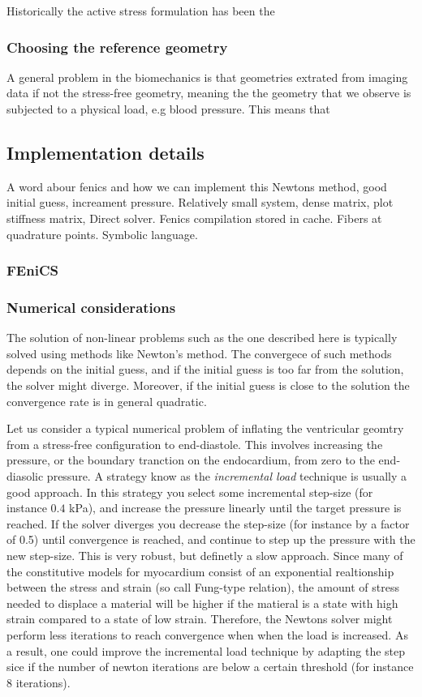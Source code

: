 Historically the active stress formulation has been the


\subsubsection{Choosing the reference geometry}
A general problem in the biomechanics is that geometries extrated from
imaging data if not the stress-free geometry, meaning the the geometry
that we observe is subjected to a physical load, e.g blood pressure.
This means that 


\subsection{Implementation details}
A word abour fenics and how we can implement this
Newtons method, good initial guess, increament pressure.
Relatively small system, dense matrix, plot stiffness matrix, Direct
solver.
Fenics compilation stored in cache.
Fibers at quadrature points. Symbolic language.

\subsubsection{FEniCS}



\subsubsection{Numerical considerations}
The solution of non-linear problems such as the one described here is
typically solved using methods like Newton's method. The convergece of
such methods depends on the initial guess, and if the
initial guess is too far from the solution, the solver might diverge.
Moreover, if the initial guess is close to the solution the
convergence rate is in general quadratic.

Let us consider a
typical numerical problem of inflating the ventricular geomtry from a
stress-free configuration to end-diastole. This involves increasing
the pressure, or the boundary tranction on the endocardium, from zero
to the end-diasolic pressure. A strategy know as the
\emph{incremental load} technique is usually a good approach. In this
strategy you select some incremental step-size (for instance $0.4$
kPa), and increase the pressure linearly until the target pressure is
reached. If the solver diverges you decrease the step-size (for
instance by a factor of 0.5) until convergence is reached, and
continue to step up the pressure with the new step-size. This is very
robust, but definetly a slow approach. Since many of the 
constitutive models for myocardium consist of an exponential
realtionship between the stress and strain (so call Fung-type
relation), the amount of stress needed to displace a material will be
higher if the matieral is a state with high strain compared to a state
of low strain. Therefore, the Newtons solver might perform less
iterations to reach convergence when when the load is increased. As a
result, one could improve the incremental load technique by adapting
the step sice if the number of newton iterations are below a certain
threshold (for instance $8$ iterations).

